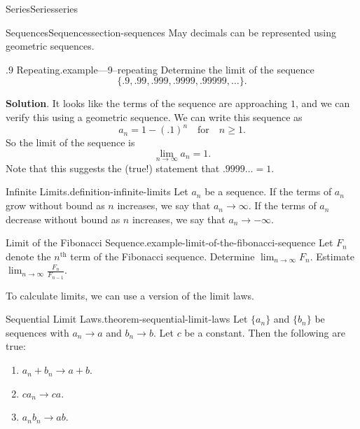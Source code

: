 \documentclass[oneside,10pt,]{book}
\numberwithin{equation}{section}
\begin{document}
\begin{chapterptx}{Series}{}{Series}{}{}{series}
\begin{sectionptx}{Sequences}{}{Sequences}{}{}{section-sequences}
May decimals can be represented using geometric sequences.%
\begin{example}{\(.9\) Repeating.}{example---9--repeating}%
\hypertarget{p-803}{}%
Determine the limit of the sequence%
\begin{equation*}
\{.9, .99, .999, .9999, .99999, \ldots\}\text{.}
\end{equation*}
%
\par\smallskip%
\noindent\textbf{Solution}.\hypertarget{solution-166}{}\quad%
\hypertarget{p-804}{}%
It looks like the terms of the sequence are approaching \(1\), and we can verify this using a geometric sequence. We can write this sequence as%
\begin{equation*}
a_{n} = 1 - (.1)^{n}\quad\text{for}\quad n\geq 1\text{.}
\end{equation*}
So the limit of the sequence is%
\begin{equation*}
\lim_{n\to\infty}a_{n} = 1\text{.}
\end{equation*}
Note that this suggests the (true!) statement that \(.9999\ldots = 1\).%
\end{example}
\begin{definition}{Infinite Limits.}{definition-infinite-limits}%
\hypertarget{p-805}{}%
Let \(a_{n}\) be a sequence. If the terms of \(a_{n}\) grow without bound as \(n\) increases, we say that \(a_{n}\to\infty\). If the terms of \(a_{n}\) decrease without bound as \(n\) increases, we say that \(a_{n}\to-\infty\).%
\end{definition}
\begin{example}{Limit of the Fibonacci Sequence.}{example-limit-of-the-fibonacci-sequence}%
\hypertarget{p-806}{}%
Let \(F_{n}\) denote the \(n^{\text{th}}\) term of the Fibonacci sequence. Determine \(\lim_{n\to\infty}F_{n}\). Estimate \(\lim_{n\to\infty}\frac{F_{n}}{F_{n-1}}\).%
\end{example}
\hypertarget{p-807}{}%
To calculate limits, we can use a version of the limit laws.%
\begin{theorem}{Sequential Limit Laws.}{}{theorem-sequential-limit-laws}%
\hypertarget{p-808}{}%
Let \(\{a_{n}\}\) and \(\{b_{n}\}\) be sequences with \(a_{n}\to a\) and \(b_{n}\to b\). Let \(c\) be a constant. Then the following are true:%
\leavevmode%
\begin{enumerate}
\item\hypertarget{li-82}{}\(a_{n} + b_{n} \to a + b.\)%
\item\hypertarget{li-83}{}\(ca_{n}\to ca.\)%
\item\hypertarget{li-84}{}\(a_{n}b_{n}\to ab.\)%

\end{enumerate}
\end{theorem}
\end{sectionptx}
\end{chapterptx}
\end{document}
